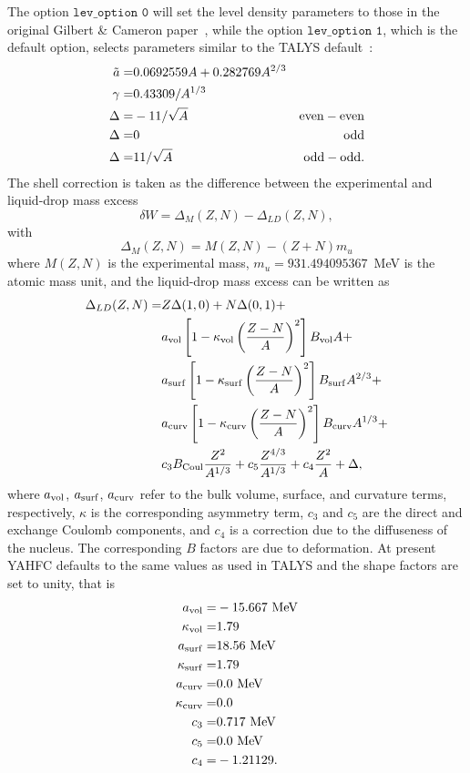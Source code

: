 \documentclass[
10pt,
showpacs,preprintnumbers,footinbib,
amsfonts,amsmath,amssymb,
aps,
prc,twocolumn,groupedaddress,superscriptaddress,
showkeys,
nofootinbib
]{revtex4-1}
\begin{document}
The option ${\texttt {lev\_option 0}}$ will set the level density parameters to those in the original Gilbert \& Cameron paper~\cite{Gilbert:1965}, while the option ${\texttt {lev\_option 1}}$, which is the default option, selects parameters similar to the TALYS default~\cite{TALYS}:
\begin{align}
\tilde a = & 0.0692559 A + 0.282769 A^{2/3} & \notag\\
\gamma = & 0.43309/A^{1/3} & \notag \\
\Delta =& -11/\sqrt{A} & {\rm {even-even}} \notag\\
\Delta =& 0 & {\rm {odd}}\notag\\
\Delta =& 11/\sqrt{A} & {\rm {odd-odd}}.
\end{align}
The shell correction is taken as the difference between the experimental and liquid-drop mass excess
\begin{equation}
\delta W = \Delta_M(Z,N) - \Delta_{LD}(Z,N),
\end{equation}
with
\begin{equation}
\Delta_M(Z,N) = M(Z,N) - (Z+N)m_u
\end{equation}
where $M(Z,N)$ is the experimental mass, $m_u = 931.494095367$~MeV is the atomic mass unit, and the liquid-drop mass excess can be written as~\cite{Myers:1966,Guet:1988,Moller:1988,Moller:1997}
\begin{align}
\Delta_{LD}(Z,N) = & Z \Delta(1,0) + N \Delta(0,1) + \notag \\
& a_{\rm vol} \left[1-\kappa_{\rm vol}\left( \frac{Z-N}{A}\right)^2\right ]B_{\rm vol}A + \notag \\
& a_{\rm surf} \left[1-\kappa_{\rm surf}\left( \frac{Z-N}{A}\right)^2\right ]B_{\rm surf}A^{2/3} + \notag \\
& a_{\rm curv} \left[1-\kappa_{\rm curv}\left( \frac{Z-N}{A}\right)^2\right ]B_{\rm curv}A^{1/3} + \notag \\
& c_3B_{\rm Coul}\frac{Z^2}{A^{1/3}} + c_5\frac{Z^{4/3}}{A^{1/3}} + c_4\frac{Z^2}{A} + \Delta,
\end{align}
where $a_{\rm vol}$, $a_{\rm surf}$, $a_{\rm curv}$ refer to the bulk volume, surface, and curvature terms, respectively, $\kappa$ is the corresponding asymmetry term, $c_3$ and $c_5$ are the direct and exchange Coulomb components, and $c_4$ is a correction due to the diffuseness of the nucleus. The corresponding $B$ factors are due to deformation. At present YAHFC defaults to the same values as used in TALYS and the shape factors are set to unity, that is
\begin{align}
a_{\rm vol} =& -15.667~{\rm MeV} \notag\\
\kappa_{\rm vol} = & 1.79 \notag\\
a_{\rm surf} =& 18.56~{\rm MeV} \notag\\
\kappa_{\rm surf} = & 1.79 \notag\\
a_{\rm curv} =& 0.0~{\rm MeV} \notag\\
\kappa_{\rm curv} = & 0.0 \notag\\
c_3 =& 0.717~{\rm MeV}\notag\\
c_5 =& 0.0~{\rm MeV}\notag\\
c_4 =& -1.21129.
\end{align}
\end{document}
